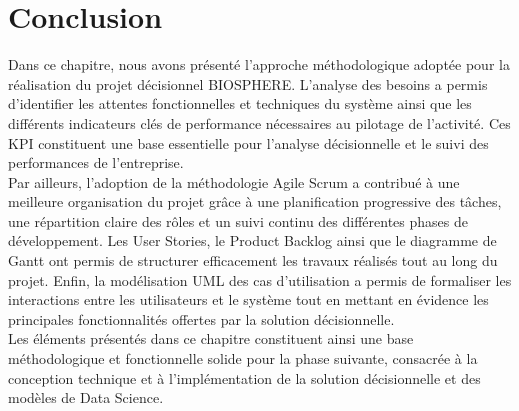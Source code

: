 \section{Conclusion}
Dans ce chapitre, nous avons présenté l’approche méthodologique adoptée pour la réalisation du projet décisionnel BIOSPHERE. L’analyse des besoins a permis d’identifier les attentes fonctionnelles et techniques du système ainsi que les différents indicateurs clés de performance nécessaires au pilotage de l’activité. Ces KPI constituent une base essentielle pour l’analyse décisionnelle et le suivi des performances de l’entreprise.\\
Par ailleurs, l’adoption de la méthodologie Agile Scrum a contribué à une meilleure organisation du projet grâce à une planification progressive des tâches, une répartition claire des rôles et un suivi continu des différentes phases de développement. Les User Stories, le Product Backlog ainsi que le diagramme de Gantt ont permis de structurer efficacement les travaux réalisés tout au long du projet.
Enfin, la modélisation UML des cas d’utilisation a permis de formaliser les interactions entre les utilisateurs et le système tout en mettant en évidence les principales fonctionnalités offertes par la solution décisionnelle.\\
Les éléments présentés dans ce chapitre constituent ainsi une base méthodologique et fonctionnelle solide pour la phase suivante, consacrée à la conception technique et à l’implémentation de la solution décisionnelle et des modèles de Data Science.





\newpage


